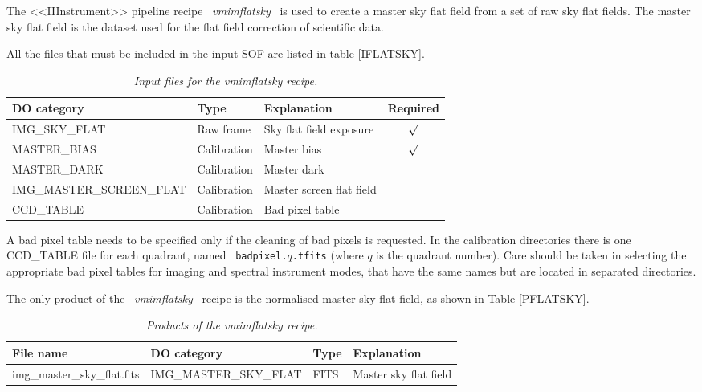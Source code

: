 The <<IIInstrument>> pipeline recipe \ {\it vmimflatsky} \ is used to create 
a master sky flat field from a set of raw sky flat fields.
The master sky flat field is the dataset used for the flat field
correction of scientific data.

All the files that must be included in the input SOF are listed in table 
\ref{IFLATSKY}.

\begin{table}[h]
  \begin{center}
    \begin{tabular}{|l|l|l|c|}
    \hline
      {\bf DO category} & {\bf Type} & {\bf Explanation} & {\bf Required} \\
    \hline 
      IMG\_SKY\_FLAT  & Raw frame   & Sky flat field exposure & $\surd$ \\
      MASTER\_BIAS    & Calibration & Master bias           & $\surd$ \\
      MASTER\_DARK    & Calibration & Master dark           &         \\
      IMG\_MASTER\_SCREEN\_FLAT & Calibration & Master screen flat field & \\
      CCD\_TABLE      & Calibration & Bad pixel table       &         \\
    \hline
    \end{tabular}
    \caption{\it Input files for the vmimflatsky recipe.}
    \label{tab:IFLATSKY}
  \end{center}
\end{table}

A bad pixel table needs to be specified only if the cleaning of bad
pixels is requested. In the calibration directories there is one
CCD\_TABLE file for each quadrant, named \ {\tt badpixel.}$q${\tt .tfits}
(where $q$ is the quadrant number). Care should be taken in selecting
the appropriate bad pixel tables for imaging and spectral instrument
modes, that have the same names but are located in separated directories.

The only product of the \ {\it vmimflatsky} \ recipe is the normalised
master sky flat field, as shown in Table \ref{PFLATSKY}. 

\begin{table}[h]
  \begin{center}
    \begin{tabular}{|l|l|l|l|}
    \hline
      {\bf File name} & {\bf DO category} & {\bf Type} & {\bf Explanation} \\
    \hline
      img\_master\_sky\_flat.fits &  IMG\_MASTER\_SKY\_FLAT & FITS & Master sky flat field \\
    \hline
    \end{tabular}
    \caption{\it Products of the vmimflatsky recipe.}
    \label{tab:PFLATSKY}
  \end{center}
\end{table}

